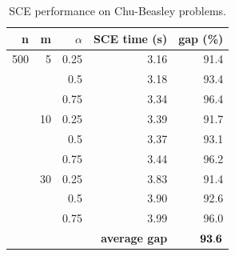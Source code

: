 \documentclass[10pt,conference, compsocconf]{IEEEtran}
\begin{document}
\begin{table}
{\begin{center}
\begin{tabular}{|r|r|r|rr|}
\textbf{n}   & \textbf{m}  & \textbf{$\alpha$} & \textbf{SCE time (s)} & \textbf{gap (\%)} \\ \hline
500 & 5 & 0.25 & 3.16 & 91.4 \\
    &   & 0.5 & 3.18 & 93.4 \\
    &   & 0.75 & 3.34 & 96.4 \\ \cline{2-5}
    & 10 & 0.25 & 3.39 & 91.7 \\
    &    & 0.5 & 3.37 & 93.1 \\
    &    & 0.75 & 3.44 & 96.2 \\ \cline{2-5}
    & 30 & 0.25 & 3.83 & 91.4 \\
    &    & 0.5 & 3.90 & 92.6 \\
    &    & 0.75 & 3.99 & 96.0 \\ \cline{2-5}
    & \multicolumn{3}{r}{\textbf{average gap}}  & $\bf 93.6$  \\ \hline
\end{tabular}
\end{center}
}
 \caption{SCE performance on Chu-Beasley problems.}
 \label{tab:chu}
\end{table}
\end{document}
